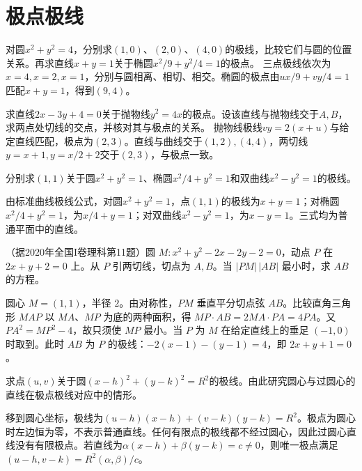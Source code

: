 \par\addvspace{12pt}

\section{极点极线}

对圆\(x^2+y^2=4\)，分别求\((1,0)\)、\((2,0)\)、\((4,0)\)的极线，比较它们与圆的位置关系。再求直线\(x+y=1\)关于椭圆\(x^2/9+y^2/4=1\)的极点。
\solutionanswer
三点极线依次为\(x=4,x=2,x=1\)，分别与圆相离、相切、相交。椭圆的极点由\(ux/9+vy/4=1\)匹配\(x+y=1\)，得到\((9,4)\)。


求直线\(2x-3y+4=0\)关于抛物线\(y^2=4x\)的极点。设该直线与抛物线交于\(A,B\)，求两点处切线的交点，并核对其与极点的关系。
\solutionanswer
抛物线极线\(vy=2(x+u)\)与给定直线匹配，极点为\((2,3)\)。直线与曲线交于\((1,2),(4,4)\)，两切线\(y=x+1,y=x/2+2\)交于\((2,3)\)，与极点一致。


分别求\((1,1)\)关于圆\(x^2+y^2=1\)、椭圆\(x^2/4+y^2=1\)和双曲线\(x^2-y^2=1\)的极线。
\par
\solutionanswer
由标准曲线极线公式，对圆\(x^2+y^2=1\)，点\((1,1)\)的极线为\(x+y=1\)；对椭圆\(x^2/4+y^2=1\)，为\(x/4+y=1\)；对双曲线\(x^2-y^2=1\)，为\(x-y=1\)。三式均为普通平面中的直线。


（据2020年全国I卷理科第11题）圆 \(M:x^2+y^2-2x-2y-2=0\)，动点 \(P\) 在 \(2x+y+2=0\) 上。从 \(P\) 引两切线，切点为 \(A,B\)。当 \(|PM|\,|AB|\) 最小时，求 \(AB\) 的方程。
\par
\solutionanswer
圆心 \(M=(1,1)\)，半径 \(2\)。由对称性，\(PM\) 垂直平分切点弦 \(AB\)。比较直角三角形 \(MAP\) 以 \(MA\)、\(MP\) 为底的两种面积，得 \(MP\cdot AB=2MA\cdot PA=4PA\)。又 \(PA^2=MP^2-4\)，故只须使 \(MP\) 最小。当 \(P\) 为 \(M\) 在给定直线上的垂足 \((-1,0)\) 时取到。此时 \(AB\) 为 \(P\) 的极线：\(-2(x-1)-(y-1)=4\)，即 \(2x+y+1=0\)。


求点\((u,v)\)关于圆\((x-h)^2+(y-k)^2=R^2\)的极线。由此研究圆心与过圆心的直线在极点极线对应中的情形。
\par
\solutionanswer
移到圆心坐标，极线为\((u-h)(x-h)+(v-k)(y-k)=R^2\)。极点为圆心时左边恒为零，不表示普通直线。任何有限点的极线都不经过圆心，因此过圆心直线没有有限极点。若直线为\(\alpha(x-h)+\beta(y-k)=c\ne0\)，则唯一极点满足\((u-h,v-k)=R^2(\alpha,\beta)/c\)。


